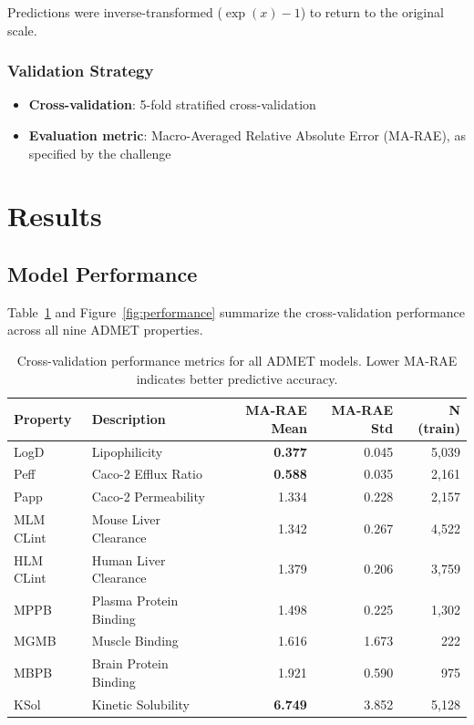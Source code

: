 \documentclass[11pt,a4paper]{article}
\newcommand{\marae}{MA-RAE}
\newcommand{\admet}{ADMET}
\begin{document}
Predictions were inverse-transformed ($\exp(x) - 1$) to return to the original scale.

\subsubsection{Validation Strategy}

\begin{itemize}
    \item \textbf{Cross-validation}: 5-fold stratified cross-validation
    \item \textbf{Evaluation metric}: Macro-Averaged Relative Absolute Error (\marae{}), as specified by the challenge
\end{itemize}

\section{Results}

\subsection{Model Performance}

Table~\ref{tab:performance} and Figure~\ref{fig:performance} summarize the cross-validation performance across all nine \admet{} properties.

\begin{table}[H]
\centering
\caption{Cross-validation performance metrics for all \admet{} models. Lower \marae{} indicates better predictive accuracy.}
\label{tab:performance}
\begin{tabular}{llrrr}
\toprule
\textbf{Property} & \textbf{Description} & \textbf{\marae{} Mean} & \textbf{\marae{} Std} & \textbf{N (train)} \\
\midrule
LogD & Lipophilicity & \textcolor{successgreen}{\textbf{0.377}} & 0.045 & 5,039 \\
Peff & Caco-2 Efflux Ratio & \textcolor{successgreen}{\textbf{0.588}} & 0.035 & 2,161 \\
Papp & Caco-2 Permeability & 1.334 & 0.228 & 2,157 \\
MLM CLint & Mouse Liver Clearance & 1.342 & 0.267 & 4,522 \\
HLM CLint & Human Liver Clearance & 1.379 & 0.206 & 3,759 \\
MPPB & Plasma Protein Binding & 1.498 & 0.225 & 1,302 \\
MGMB & Muscle Binding & 1.616 & 1.673 & 222 \\
MBPB & Brain Protein Binding & 1.921 & 0.590 & 975 \\
KSol & Kinetic Solubility & \textcolor{dangerred}{\textbf{6.749}} & 3.852 & 5,128 \\
\bottomrule
\end{tabular}
\end{table}
\end{document}
